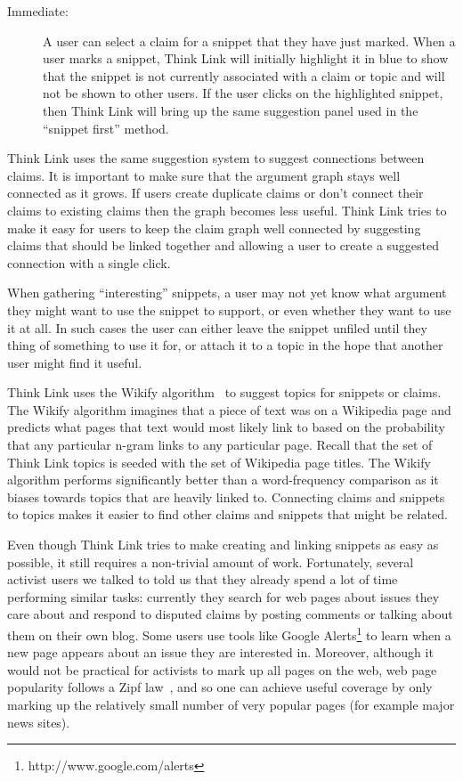 \documentclass{chi2009}
\newcommand{\todo}[1]{}
\begin{document}
\begin{description}
\item[Immediate:] A user can select a claim for a snippet that they have just marked. When a user marks a snippet, Think Link will initially highlight it in blue to show that the snippet is not currently associated with a claim or topic and will not be shown to other users. If the user clicks on the highlighted snippet, then Think Link will bring up the same suggestion panel used in the ``snippet first'' method.
\end{description}

Think Link uses the same suggestion system to suggest connections between claims. It is important to make sure that the argument graph stays well connected as it grows. If users create duplicate claims or don't connect their claims to existing claims then the graph becomes less useful. Think Link tries to make it easy for users to keep the claim graph well connected by suggesting claims that should be linked together and allowing a user to create a suggested connection with a single click. 

When gathering ``interesting'' snippets, a user may not yet know what argument they might want to use the snippet to support, or even whether they want to use it at all. In such cases the user can either leave the snippet unfiled until they thing of something to use it for, or attach it to a topic in the hope that another user might find it useful.

Think Link uses the Wikify algorithm~\cite{Mihalcea2007} to suggest topics for snippets or claims. The Wikify algorithm imagines that a piece of text was on a Wikipedia page and predicts what pages that text would most likely link to based on the probability that any particular n-gram links to any particular page. Recall that the set of Think Link topics is seeded with the set of Wikipedia page titles. The Wikify algorithm performs significantly better than a word-frequency comparison as it biases towards topics that are heavily linked to. Connecting claims and snippets to topics makes it easier to find other claims and snippets that might be related.

\todo{Talk about previewing a topic by showing wikipedia page}

Even though Think Link tries to make creating and linking snippets as easy as possible, it still requires a non-trivial amount of work. Fortunately, several activist users we talked to told us that they already spend a lot of time performing similar tasks: currently they search for web pages about issues they care about and respond to disputed claims by posting comments or talking about them on their own blog. Some users use tools like Google Alerts\footnote{http://www.google.com/alerts} to learn when a new page appears about an issue they are interested in. Moreover, although it would not be practical for activists to mark up all pages on the web, web page popularity follows a Zipf law~\cite{Krashakov2006}, and so one can achieve useful coverage by only marking up the relatively small number of very popular pages (for example major news sites).
\end{document}
